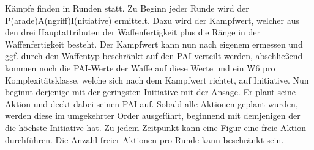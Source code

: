 \documentclass[a4paper,12pt,oneside]{book}
\begin{document}
%

Kämpfe finden in Runden statt. Zu Beginn jeder Runde wird der P(arade)A(ngriff)I(nitiative) ermittelt. Dazu wird der Kampfwert, welcher aus den drei Hauptattributen der Waffenfertigkeit plus die Ränge in der Waffenfertigkeit besteht. Der Kampfwert kann nun nach eigenem ermessen und ggf. durch den Waffentyp beschränkt auf den PAI verteilt werden, abschließend kommen noch die PAI-Werte der Waffe auf diese Werte und ein W6 pro Komplexitätsklasse, welche sich nach dem Kampfwert richtet, auf Initiative. Nun beginnt derjenige mit der geringsten Initiative mit der Ansage. Er plant seine Aktion und deckt dabei seinen PAI auf. Sobald alle Aktionen geplant wurden, werden diese im umgekehrter Order ausgeführt, beginnend mit demjenigen der die höchste Initiative hat. Zu jedem Zeitpunkt kann eine Figur eine freie Aktion durchführen. Die Anzahl freier Aktionen pro Runde kann beschränkt sein.
\end{document}
